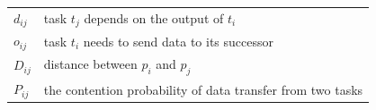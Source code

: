 \begin{table}[t]
\begin{tabular}{l l}
$d_{ij}$ & task $t_j$ depends on the output of $t_i$\\
$o_{ij}$ & task $t_i$ needs to send data to its successor\\
$D_{ij}$ & distance between $p_i$ and $p_j$\\
$P_{ij}$ & the contention probability of data transfer from two tasks\\
\hline
\end{tabular}
\end{table}


